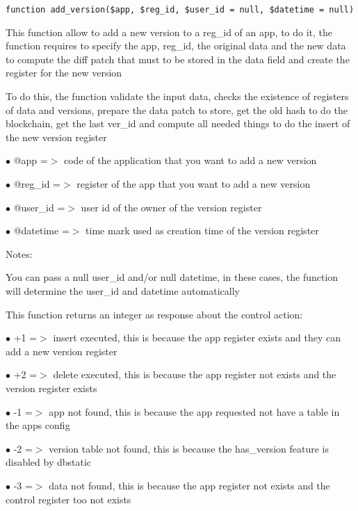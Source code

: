 \documentclass[a4paper]{book}
\begin{document}
\begin{lstlisting}
function add_version($app, $reg_id, $user_id = null, $datetime = null)
\end{lstlisting}

This function allow to add a new version to a reg\_id of an app, to do it,
the function requires to specify the app, reg\_id, the original data and
the new data to compute the diff patch that must to be stored in the data
field and create the register for the new version

To do this, the function validate the input data, checks the existence
of registers of data and versions, prepare the data patch to store, get
the old hash to do the blockchain, get the last ver\_id and compute all
needed things to do the insert of the new version register

\begin{compactitem}
\item[\color{myblue}$\bullet$] @app      =$>$ code of the application that you want to add a new version
\item[\color{myblue}$\bullet$] @reg\_id   =$>$ register of the app that you want to add a new version
\item[\color{myblue}$\bullet$] @user\_id  =$>$ user id of the owner of the version register
\item[\color{myblue}$\bullet$] @datetime =$>$ time mark used as creation time of the version register
\end{compactitem}

Notes:

You can pass a null user\_id and/or null datetime, in these cases, the
function will determine the user\_id and datetime automatically

This function returns an integer as response about the control action:

\begin{compactitem}
\item[\color{myblue}$\bullet$] +1 =$>$ insert executed, this is because the app register exists and they can add a new version register
\item[\color{myblue}$\bullet$] +2 =$>$ delete executed, this is because the app register not exists and the version register exists
\item[\color{myblue}$\bullet$] -1 =$>$ app not found, this is because the app requested not have a table in the apps config
\item[\color{myblue}$\bullet$] -2 =$>$ version table not found, this is because the has\_version feature is disabled by dbstatic
\item[\color{myblue}$\bullet$] -3 =$>$ data not found, this is because the app register not exists and the control register too not exists
\end{compactitem}
\end{document}
